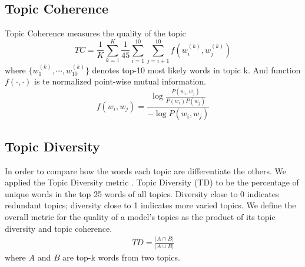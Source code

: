 \subsection{Topic Coherence}Topic Coherence\cite{mimno_optimizing_2011} measures the quality of the topic 
\begin{equation}
TC=\frac{1}{K}\sum_{k=1}^{K}\frac{1}{45}\sum_{i=1}^{10}\sum_{j=i+1}^{10}f(w_i^{(k)},w_j^{(k)})\end{equation}
where $\{w_1^{(k)},\cdots,w_{10}^{(k)}\}$ denotes top-10 most likely words in topic k. And function $f(\cdot,\cdot)$ is te normalized point-wise mutual information.\begin{equation}
f(w_i,w_j)=\frac{\log\frac{P(w_i,w_j)}{P(w_i)P(w_j)}}{-\log P(w_i,w_j)}\end{equation}
\subsection{Topic Diversity} In order to compare how the words each topic are differentiate the others. We applied the Topic Diversity metric \cite{dieng_topic_2019}. Topic Diversity (TD) to be the percentage of unique words in the top 25 words of all topics. Diversity close to 0 indicates redundant topics; diversity close to 1 indicates more varied topics. We define the overall metric for the quality of a model’s topics as the product of its topic diversity and topic coherence.
\begin{align}
TD=\frac{|A\cap B|}{|A \cup B|}
\end{align}
where $ A $ and $ B $ are top-k words from two topics. 